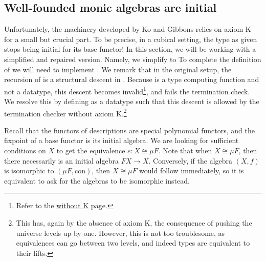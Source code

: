 \subsection{Well-founded monic algebras are initial}\label{ssec:wellfounded}
Unfortunately, the machinery developed by Ko and Gibbons \cite{progorn} relies on axiom K for a small but crucial part. To be precise, in a cubical setting, the type  as given stops being initial for its base functor! In this section, we will be working with a simplified and repaired version. Namely, we simplify  to 
To complete the definition of 
we will need to implement . We remark that in the original setup, the recursion of  is a structural descent in . Because  is a type computing function and not a datatype, this descent becomes invalid\footnote{Refer to the  \href{https://agda.readthedocs.io/en/latest/language/without-k.html\#restrictions-on-termination-checking}{without K} page.}, and  fails the termination check. We resolve this by defining  as a datatype
such that this descent is allowed by the termination checker without axiom K.\footnote{This has, again by the absence of axiom K, the consequence of pushing the universe levels up by one. However, this is not too troublesome, as equivalences can go between two levels, and indeed types are equivalent to their lifts.}

Recall that the  functors of descriptions are special polynomial functors, and the fixpoint of a base functor is its initial algebra. We are looking for sufficient conditions on $X$ to get the equivalence $e: X \cong \mu F$. Note that when $X \cong \mu F$, then there necessarily is an initial algebra $F X \to X$. Conversely, if the algebra $(X, f)$ is isomorphic to $(\mu F, \mathrm{con})$, then $X \cong \mu F$ would follow immediately, so it is equivalent to ask for the algebras to be isomorphic instead.

\begin{comment}
The situation so far is summarized by the diagram
\[\begin{tikzcd}[ampersand replacement=\&]
	\& {F\mu_F} \\
	X \& {\mu F}
	\arrow["{\mathrm{con}}", from=1-2, to=2-2]
	\arrow["e"', dashed, tail reversed, from=2-1, to=2-2]
\end{tikzcd}\]
\end{comment}
